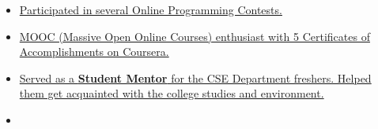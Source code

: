 \documentclass[10pt,a4paper]{article}
\begin{document}
\vspace{0.15cm}
\begin{itemize}[labelindent=1.5em,labelsep=-0.3cm,leftmargin=*]

\item \headedsubsection 
{\href{}{\normalfont Participated in several Online Programming Contests.
}}{{{}}}


\item \headedsubsection 
{\href{}{\normalfont MOOC (Massive Open Online Courses) enthusiast with 5 Certificates of Accomplishments on Coursera.
}}{{{}}}

\item \headedsubsection 
{\href{}{\normalfont Served as a \textbf{Student Mentor} for the CSE Department freshers. Helped them get acquainted
with the college studies and environment.
}}{{{}}}

\item {}

\end{itemize}
\end{document}
